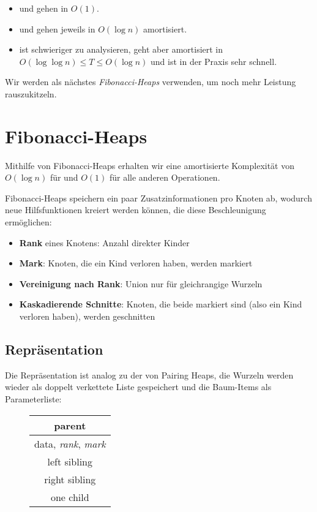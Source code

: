 \begin{itemize}
  \item {} und  gehen in \( O(1) \).
  \item {} und  gehen jeweils in \( O(\log n) \) amortisiert.
  \item {} ist schwieriger zu analysieren, geht aber amortisiert in \( O(\log\log n) \leq T \leq O(\log n) \) und ist in der Praxis sehr schnell.
\end{itemize}

Wir werden als nächstes \emph{Fibonacci-Heaps} verwenden, um noch mehr Leistung rauszukitzeln.

\section{Fibonacci-Heaps}

Mithilfe von Fibonacci-Heaps erhalten wir eine amortisierte Komplexität von \( O(\log n) \) für  und \( O(1) \) für alle anderen Operationen.

Fibonacci-Heaps speichern ein paar Zusatzinformationen pro Knoten ab, wodurch neue Hilfsfunktionen kreiert werden können, die diese Beschleunigung ermöglichen:

\begin{itemize}
  \item \textbf{Rank} eines Knotens: Anzahl direkter Kinder
  \item \textbf{Mark}: Knoten, die ein Kind verloren haben, werden markiert
  \item \textbf{Vereinigung nach Rank}: Union nur für gleichrangige Wurzeln
  \item \textbf{Kaskadierende Schnitte}: Knoten, die beide markiert sind (also ein Kind verloren haben), werden geschnitten
\end{itemize}

\subsection{Repräsentation}

\begin{minipage}{.725\textwidth}
  Die Repräsentation ist analog zu der von Pairing Heaps, die Wurzeln werden wieder als doppelt verkettete Liste gespeichert und die Baum-Items als Parameterliste:
\end{minipage}
\hfill
\begin{minipage}{.25\textwidth}
  \begin{figure}[H]
    \begin{tabular}{| c |}
      \hline
      parent \\
      \hline
      data, \emph{rank}, \emph{mark} \\
      \hline
      left sibling \\
      \hline
      right sibling \\
      \hline
      one child \\
      \hline
    \end{tabular}
  \end{figure}
\end{minipage}


